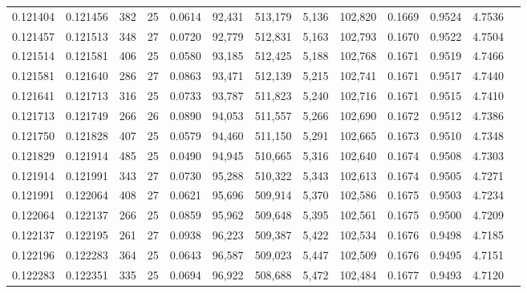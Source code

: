 \begin{tabular}{rrrrrrrrrrrrr}
0.121404 & 0.121456 & 382 &  25 &                                     0.0614 &  92,431 & 513,179 &   5,136 & 102,820 & 0.1669 & 0.9524 & 4.7536 \\
0.121457 & 0.121513 & 348 &  27 &                                     0.0720 &  92,779 & 512,831 &   5,163 & 102,793 & 0.1670 & 0.9522 & 4.7504 \\
0.121514 & 0.121581 & 406 &  25 &                                     0.0580 &  93,185 & 512,425 &   5,188 & 102,768 & 0.1671 & 0.9519 & 4.7466 \\
0.121581 & 0.121640 & 286 &  27 &                                     0.0863 &  93,471 & 512,139 &   5,215 & 102,741 & 0.1671 & 0.9517 & 4.7440 \\
0.121641 & 0.121713 & 316 &  25 &                                     0.0733 &  93,787 & 511,823 &   5,240 & 102,716 & 0.1671 & 0.9515 & 4.7410 \\
0.121713 & 0.121749 & 266 &  26 &                                     0.0890 &  94,053 & 511,557 &   5,266 & 102,690 & 0.1672 & 0.9512 & 4.7386 \\
0.121750 & 0.121828 & 407 &  25 &                                     0.0579 &  94,460 & 511,150 &   5,291 & 102,665 & 0.1673 & 0.9510 & 4.7348 \\
0.121829 & 0.121914 & 485 &  25 &                                     0.0490 &  94,945 & 510,665 &   5,316 & 102,640 & 0.1674 & 0.9508 & 4.7303 \\
0.121914 & 0.121991 & 343 &  27 &                                     0.0730 &  95,288 & 510,322 &   5,343 & 102,613 & 0.1674 & 0.9505 & 4.7271 \\
0.121991 & 0.122064 & 408 &  27 &                                     0.0621 &  95,696 & 509,914 &   5,370 & 102,586 & 0.1675 & 0.9503 & 4.7234 \\
0.122064 & 0.122137 & 266 &  25 &                                     0.0859 &  95,962 & 509,648 &   5,395 & 102,561 & 0.1675 & 0.9500 & 4.7209 \\
0.122137 & 0.122195 & 261 &  27 &                                     0.0938 &  96,223 & 509,387 &   5,422 & 102,534 & 0.1676 & 0.9498 & 4.7185 \\
0.122196 & 0.122283 & 364 &  25 &                                     0.0643 &  96,587 & 509,023 &   5,447 & 102,509 & 0.1676 & 0.9495 & 4.7151 \\
0.122283 & 0.122351 & 335 &  25 &                                     0.0694 &  96,922 & 508,688 &   5,472 & 102,484 & 0.1677 & 0.9493 & 4.7120 \\

\end{tabular}
